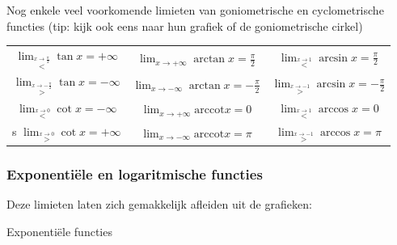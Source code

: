 Nog enkele veel voorkomende limieten van goniometrische
en cyclometrische functies (tip: kijk ook eens naar hun grafiek of
de goniometrische cirkel)

\begin{table}[ht]
	\centering
	\begin{tabular}{c|c|c}
		$\lim_{\overset{x\rightarrow\frac{\pi}{2}}{<}}\tan x=+\infty$ & $\lim_{x\rightarrow+\infty}\arctan x=\frac{\pi}{2}$ & $\lim_{\overset{x\rightarrow1}{<}}\arcsin x=\frac{\pi}{2}$\\
		$\lim_{\overset{x\rightarrow-\frac{\pi}{2}}{>}}\tan x=-\infty$ & $\lim_{x\rightarrow-\infty}\arctan x=-\frac{\pi}{2}$ & $\lim_{\overset{x\rightarrow-1}{>}}\arcsin x=-\frac{\pi}{2}$\\
		$\lim_{\overset{x\rightarrow0}{<}}\cot x=-\infty$ & $\lim_{x\rightarrow+\infty}\mathrm{arccot}x=0$ & $\lim_{\overset{x\rightarrow1}{<}}\arccos x=0$\\s
		$\lim_{\overset{x\rightarrow0}{>}}\cot x=+\infty$  & $\lim_{x\rightarrow-\infty}\mathrm{arccot}x=\pi$ & $\lim_{\overset{x\rightarrow-1}{>}}\arccos x=\pi$\\
	\end{tabular}
\end{table}

\begin{minipage}{.5\linewidth}
\end{minipage}
\begin{minipage}{.5\linewidth}
\end{minipage}

\subsubsection{Exponenti\"ele en logaritmische functies}

Deze limieten laten zich gemakkelijk afleiden uit de grafieken:

Exponenti\"ele functies

